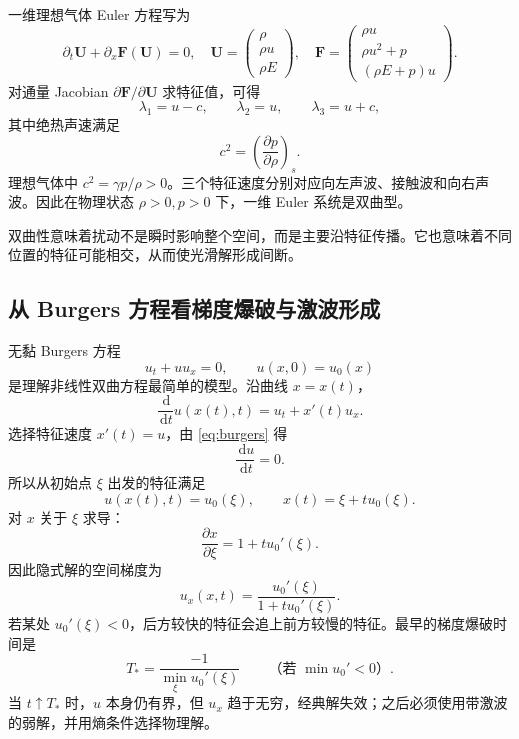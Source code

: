 \documentclass[cn,hazy,blue,11pt,normal]{elegantnote}
\numberwithin{equation}{section}
\newcommand{\dd}{\,\mathrm d}
\newcommand{\vct}[1]{\bm{#1}}
\begin{document}
一维理想气体 Euler 方程写为
\begin{equation}
 \partial_t\vct U+\partial_x\vct F(\vct U)=0,
 \quad
 \vct U=
 \begin{pmatrix}\rho\\ \rho u\\ \rho E\end{pmatrix},
 \quad
 \vct F=
 \begin{pmatrix}
 \rho u\\
 \rho u^2+p\\
 (\rho E+p)u
 \end{pmatrix}.
\end{equation}
对通量 Jacobian $\partial\vct F/\partial\vct U$ 求特征值，可得
\begin{equation}
 \boxed{\lambda_1=u-c,\qquad \lambda_2=u,\qquad \lambda_3=u+c,}
\end{equation}
其中绝热声速满足
\begin{equation}
 \boxed{c^2=\left(\frac{\partial p}{\partial\rho}\right)_s.}
\end{equation}
理想气体中 $c^2=\gamma p/\rho>0$。三个特征速度分别对应向左声波、接触波和向右声波。因此在物理状态 $\rho>0,p>0$ 下，一维 Euler 系统是双曲型。

双曲性意味着扰动不是瞬时影响整个空间，而是主要沿特征传播。它也意味着不同位置的特征可能相交，从而使光滑解形成间断。

\subsection{从 Burgers 方程看梯度爆破与激波形成}

无黏 Burgers 方程
\begin{equation}
 u_t+uu_x=0,
 \qquad u(x,0)=u_0(x) \label{eq:burgers}
\end{equation}
是理解非线性双曲方程最简单的模型。沿曲线 $x=x(t)$，
\begin{equation}
 \frac{\dd}{\dd t}u(x(t),t)=u_t+x'(t)u_x.
\end{equation}
选择特征速度 $x'(t)=u$，由 \eqref{eq:burgers} 得
\begin{equation}
 \frac{\dd u}{\dd t}=0.
\end{equation}
所以从初始点 $\xi$ 出发的特征满足
\begin{equation}
 u(x(t),t)=u_0(\xi),
 \qquad x(t)=\xi+t u_0(\xi).
\end{equation}
对 $x$ 关于 $\xi$ 求导：
\begin{equation}
 \frac{\partial x}{\partial\xi}=1+t u_0'(\xi).
\end{equation}
因此隐式解的空间梯度为
\begin{equation}
 \boxed{u_x(x,t)=\frac{u_0'(\xi)}{1+t u_0'(\xi)}.} \label{eq:burgers-gradient}
\end{equation}
若某处 $u_0'(\xi)<0$，后方较快的特征会追上前方较慢的特征。最早的梯度爆破时间是
\begin{equation}
 \boxed{T_*=\frac{-1}{\min_\xi u_0'(\xi)}}
 \qquad\text{（若 $\min u_0'<0$）}.
\end{equation}
当 $t\uparrow T_*$ 时，$u$ 本身仍有界，但 $u_x$ 趋于无穷，经典解失效；之后必须使用带激波的弱解，并用熵条件选择物理解。
\end{document}
